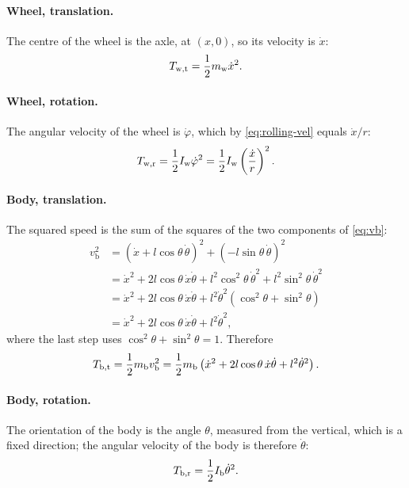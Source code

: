 \paragraph{Wheel, translation.}
The centre of the wheel is the axle, at $(x,0)$, so its velocity is $\dot x$:
\begin{equation}
  T_{\mathrm{w,t}} = \frac12m_{\mathrm w}\dot x^2 .
\end{equation}

\paragraph{Wheel, rotation.}
The angular velocity of the wheel is $\dot\varphi$, which by
\cref{eq:rolling-vel} equals $\dot x/r$:
\begin{equation}
  T_{\mathrm{w,r}} = \frac12I_{\mathrm w}\dot\varphi^2 = \frac12I_{\mathrm w}\left(\frac{\dot x}{r}\right)^2 .
\end{equation}

\paragraph{Body, translation.}
The squared speed is the sum of the squares of the two components of
\cref{eq:vb}:
\begin{align}
  v_{\mathrm b}^2 &= (\dot x + l\cos\theta\,\dot\theta)^2 + (-l\sin\theta\,\dot\theta)^2 \nonumber\\
  &= \dot x^2 + 2l\cos\theta\,\dot x\dot\theta + l^2\cos^2\theta\,\dot\theta^2 + l^2\sin^2\theta\,\dot\theta^2 \nonumber\\
  &= \dot x^2 + 2l\cos\theta\,\dot x\dot\theta + l^2\dot\theta^2\left(\cos^2\theta + \sin^2\theta\right) \nonumber\\
  &= \dot x^2 + 2l\cos\theta\,\dot x\dot\theta + l^2\dot\theta^2 ,
\end{align}
where the last step uses $\cos^2\theta + \sin^2\theta = 1$. Therefore
\begin{equation}
  T_{\mathrm{b,t}} = \frac12m_{\mathrm b} v_{\mathrm b}^2
  = \frac12m_{\mathrm b}\left(\dot x^2 + 2l\cos\theta\,\dot x\dot\theta + l^2\dot\theta^2\right).
\end{equation}

\paragraph{Body, rotation.}
The orientation of the body is the angle $\theta$, measured from the vertical,
which is a fixed direction; the angular velocity of the body is therefore
$\dot\theta$:
\begin{equation}
  T_{\mathrm{b,r}} = \frac12I_{\mathrm b}\dot\theta^2 .
\end{equation}

